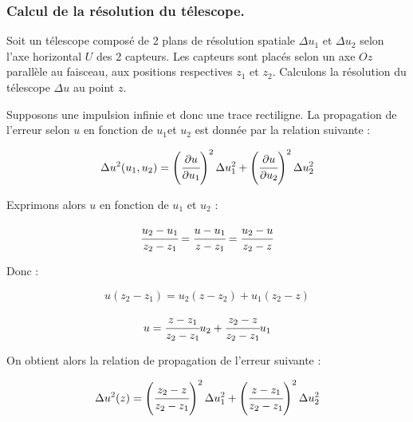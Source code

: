   \subsubsection{Calcul de la résolution du t\'elescope.}
  
  Soit un t\'elescope compos\'e de 2 plans de r\'esolution spatiale $\Delta u_1$ et $\Delta u_2$ selon l'axe horizontal $U$ des 2 capteurs. Les capteurs sont plac\'es selon un axe $Oz$ parall\`ele au faisceau, aux positions respectives $z_1$ et $z_2$. Calculons la r\'esolution du t\'elescope $\Delta u$ au point $z$. 
  
%   

   \medskip

  Supposons une impulsion infinie et donc une trace rectiligne. La propagation de l'erreur selon $u$ en fonction de $u_1$et $u_2$ est donn\'ee par la relation suivante :
  
  \begin{equation}
   \Delta u ^2(u_1,u_2) = \left( \cfrac{\partial u}{\partial u_1} \right)^2 \Delta u_1 ^2 + \left( \cfrac{\partial u}{\partial u_2} \right)^2 \Delta u_2 ^2
  \end{equation}
  
  Exprimons alors $u$ en fonction de $u_1$ et $u_2$ :
  
  \begin{equation}
   \cfrac{u_2-u_1}{z_2-z_1} = \cfrac{u-u_1}{z-z_1} = \cfrac{u_2-u}{z_2-z}
  \end{equation}
  
  Donc : 
  
  \begin{equation}
   u (z_2 - z_1) = u_2 (z - z_2) + u_1 (z_2 -z)
  \end{equation}
  
  \begin{equation}
   u = \cfrac{z - z_1}{z_2 - z_1} u_2 + \cfrac{z_2 - z}{z_2 - z_1} u_1
  \end{equation}

   On obtient alors la relation de propagation de l'erreur suivante :

  \begin{equation}
   \Delta u ^2(z) = \left( \cfrac{z_2 - z}{z_2 - z_1} \right)^2 \Delta u_1 ^2 + \left( \cfrac{z - z_1}{z_2 - z_1} \right)^2 \Delta u_2 ^2
  \end{equation}
  
